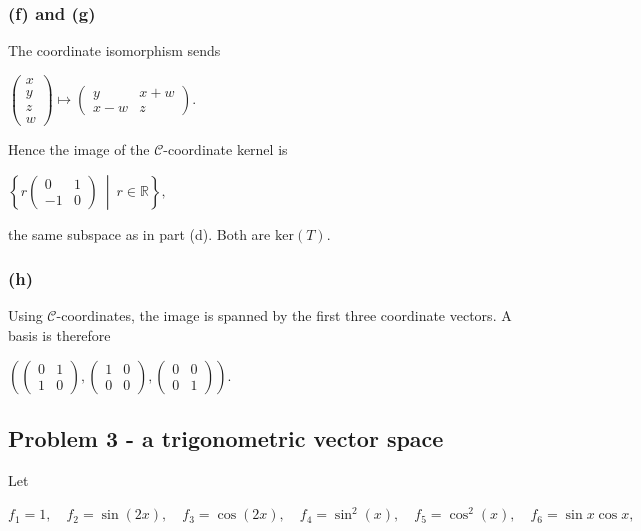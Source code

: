 \subsubsection{(f) and (g)}

The coordinate isomorphism sends

\(\begin{pmatrix}
x \\
y \\
z \\
w
\end{pmatrix}\mapsto\begin{pmatrix}
y & {x + w} \\
{x - w} & z
\end{pmatrix}.\)

Hence the image of the \(\mathcal{C}\)-coordinate kernel is

\(\left\{ r\begin{pmatrix}
0 & 1 \\
{- 1} & 0
\end{pmatrix}\  \middle| \ r \in \mathbb{R} \right\},\)

the same subspace as in part (d). Both are \(\text{ker}(T)\).

\subsubsection{(h)}

Using \(\mathcal{C}\)-coordinates, the image is spanned by the first three coordinate vectors. A basis is therefore

\(\left( {\begin{pmatrix}
0 & 1 \\
1 & 0
\end{pmatrix},\begin{pmatrix}
1 & 0 \\
0 & 0
\end{pmatrix},\begin{pmatrix}
0 & 0 \\
0 & 1
\end{pmatrix}} \right).\)

\subsection{Problem 3 - a trigonometric vector space}

Let

\(f_{1} = 1,\quad f_{2} = \sin\left( {2x} \right),\quad f_{3} = \cos\left( {2x} \right),\quad f_{4} = \sin^{2}(x),\quad f_{5} = \cos^{2}(x),\quad f_{6} = \sin x\cos x,\)

